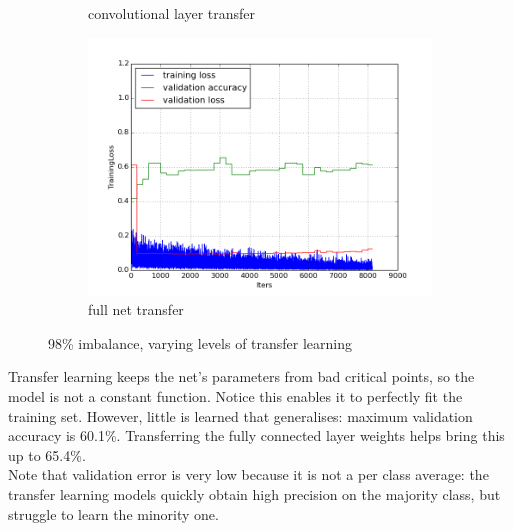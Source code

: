 \documentclass[a4paper,11pt]{article}
\begin{document}
\begin{figure}
\begin{minipage}[b]{\textwidth}
\begin{subfigure}{.5\textwidth}
        \caption{convolutional layer transfer}\label{fig:2b}
      \end{subfigure} \par \vspace*{3pt} %
      \begin{subfigure}{.5\textwidth} 
        \centering
        \includegraphics[scale=0.4]{images/plot_clampdetCI98_none_bs128_lr4.png}
        \caption{full net transfer}\label{fig:2b}
      \end{subfigure} \par \vspace*{3pt} %
      \caption{98\% imbalance, varying levels of transfer learning}\label{fig:2}
    \end{minipage}%
    \label{f46}
\end{figure}

Transfer learning keeps the net's parameters from bad critical points, so the model is not a constant function. Notice this enables it to perfectly fit the training set. However, little is learned that generalises: maximum validation accuracy is 60.1\%. Transferring the fully connected layer weights helps bring this up to 65.4\%. \\

Note that validation error is very low because it is not a per class average: the transfer learning models quickly obtain high precision on the majority class, but struggle to learn the minority one. 
\end{document}
